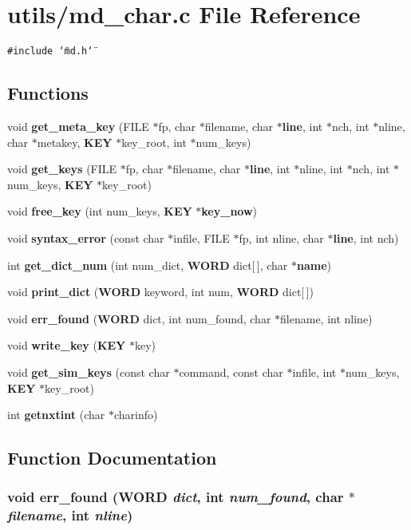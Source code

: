 \section{utils/md\_\-char.c File Reference}
\label{md__char_8c}
{\tt \#include \char`\"{}md.h\char`\"{}}\par
\subsection*{Functions}
\begin{CompactItemize}
\item 
void {\bf get\_\-meta\_\-key} (FILE $\ast$fp, char $\ast$filename, char $\ast${\bf line}, int $\ast$nch, int $\ast$nline, char $\ast$metakey, {\bf KEY} $\ast$key\_\-root, int $\ast$num\_\-keys)
\item 
void {\bf get\_\-keys} (FILE $\ast$fp, char $\ast$filename, char $\ast${\bf line}, int $\ast$nline, int $\ast$nch, int $\ast$num\_\-keys, {\bf KEY} $\ast$key\_\-root)
\item 
void {\bf free\_\-key} (int num\_\-keys, {\bf KEY} $\ast${\bf key\_\-now})
\item 
void {\bf syntax\_\-error} (const char $\ast$infile, FILE $\ast$fp, int nline, char $\ast${\bf line}, int nch)
\item 
int {\bf get\_\-dict\_\-num} (int num\_\-dict, {\bf WORD} dict[$\,$], char $\ast${\bf name})
\item 
void {\bf print\_\-dict} ({\bf WORD} keyword, int num, {\bf WORD} dict[$\,$])
\item 
void {\bf err\_\-found} ({\bf WORD} dict, int num\_\-found, char $\ast$filename, int nline)
\item 
void {\bf write\_\-key} ({\bf KEY} $\ast$key)
\item 
void {\bf get\_\-sim\_\-keys} (const char $\ast$command, const char $\ast$infile, int $\ast$num\_\-keys, {\bf KEY} $\ast$key\_\-root)
\item 
int {\bf getnxtint} (char $\ast$charinfo)
\end{CompactItemize}


\subsection{Function Documentation}
\subsubsection{\setlength{\rightskip}{0pt plus 5cm}void err\_\-found ({\bf WORD} {\em dict}, int {\em num\_\-found}, char $\ast$ {\em filename}, int {\em nline})}\label{md__char_8c_a49e8b65ece1730584ffece22c01a315}


